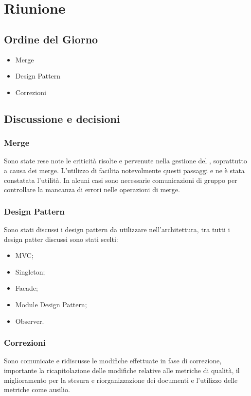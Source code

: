 \section{Riunione}
\subsection{Ordine del Giorno}
\begin{itemize}
	\item Merge
	\item Design Pattern
	\item Correzioni
\end{itemize}

\subsection{Discussione e decisioni}

\subsubsection{Merge}
Sono state rese note le criticità risolte e pervenute nella gestione del , soprattutto a causa dei merge. L'utilizzo di  facilita notevolmente questi passaggi e ne è stata constatata l'utilità. In alcuni casi sono necessarie comunicazioni di gruppo per controllare la mancanza di errori nelle operazioni di merge.

\subsubsection{Design Pattern}
Sono stati discussi i design pattern da utilizzare nell'architettura, tra tutti i design patter discussi sono stati scelti:
\begin{itemize}
	\item MVC;
	\item Singleton;
	\item Facade;
	\item Module Design Pattern;
	\item Observer.
\end{itemize}

\subsubsection{Correzioni}
Sono comunicate e ridiscusse le modifiche effettuate in fase di correzione, importante la ricapitolazione delle modifiche relative alle metriche di qualità, il miglioramento per la stesura e riorganizzazione dei documenti e l'utilizzo delle metriche come ausilio.


\clearpage
